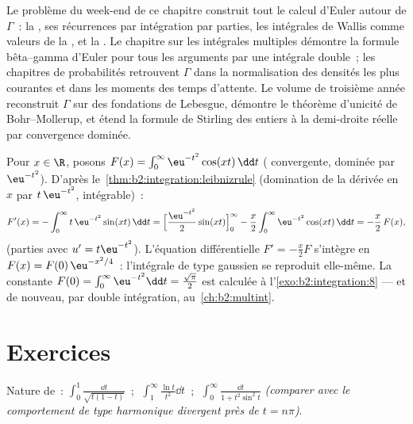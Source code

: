 \begin{remark}
Le problème du week-end de ce chapitre construit tout le calcul
d'Euler autour de $\Gamma$~: la , ses récurrences par
intégration par parties, les intégrales de Wallis comme valeurs de la
, et la . Le chapitre sur les
intégrales multiples démontre la formule bêta--gamma d'Euler pour tous
les arguments par une intégrale double~; les chapitres de probabilités
retrouvent $\Gamma$ dans la normalisation des densités les plus courantes
et dans les moments des temps d'attente. Le volume de troisième année
reconstruit $\Gamma$ sur des fondations de Lebesgue, démontre le
théorème d'unicité de Bohr--Mollerup, et étend la formule de Stirling
des entiers à la demi-droite réelle par convergence dominée.
\end{remark}

\begin{example}\label{ex:b2:integration:laplace}
Pour $x \in \R$, posons $F(x) = \int_0^{\infty} \eu^{-t^2}\cos(xt)\,\dd
t$ ( convergente, dominée par $\eu^{-t^2}$). D'après
le~\cref{thm:b2:integration:leibnizrule} (domination de la
dérivée en $x$ par $t\,\eu^{-t^2}$, intégrable)~:
\[
F'(x) = -\int_0^\infty t\,\eu^{-t^2}\sin(xt)\,\dd t
= \Bigl[\frac{\eu^{-t^2}}{2}\sin(xt)\Bigr]_0^\infty
- \frac x2\int_0^\infty \eu^{-t^2}\cos(xt)\,\dd t
= -\frac x2\,F(x),
\]
(parties avec $u' = t\eu^{-t^2}$). L'équation différentielle $F' =
-\frac x2 F$ s'intègre en $F(x) = F(0)\,\eu^{-x^2/4}$~: l'intégrale de type gaussien
se reproduit elle-même. La constante $F(0) =
\int_0^\infty \eu^{-t^2}\dd t = \frac{\sqrt\pi}{2}$ est calculée à
l'\cref{exo:b2:integration:8} --- et de nouveau, par double intégration,
au~\cref{ch:b2:multint}.
\end{example}

\section{Exercices}

\begin{exercise}[$\star$]\label{exo:b2:integration:1}
Nature de~:
$\displaystyle\int_0^1 \frac{\dd t}{\sqrt{t(1-t)}}$~;
$\;\displaystyle\int_1^\infty \frac{\ln t}{t^2}\dd t$~;
$\;\displaystyle\int_0^\infty \frac{\dd t}{1 + t^2\sin^2 t}$
\emph{(comparer avec le comportement de type harmonique divergent près de $t =
n\pi$)}.
\end{exercise}

